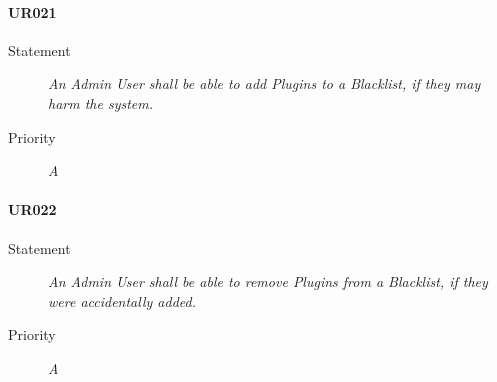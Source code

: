 \paragraph*{UR021}
\begin{description}
  \item [Statement] 
    \textit{An \gls{Admin User} shall be able to add \gls{Plugins} to a \gls{Blacklist}, if they may harm the system.}
  \item [Priority] \textit{A}
\end{description}

\paragraph*{UR022}
\begin{description}
  \item [Statement] 
    \textit{An \gls{Admin User} shall be able to remove \gls{Plugins} from a \gls{Blacklist}, if they were accidentally added.}
  \item [Priority] \textit{A}
\end{description}
